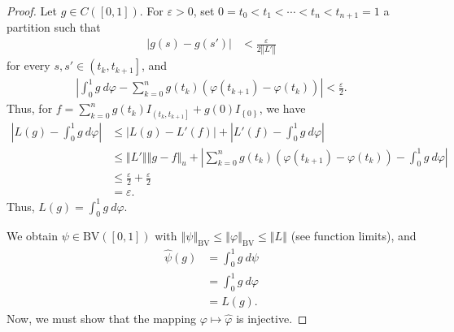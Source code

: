 \documentclass[12pt]{extarticle}
\newcommand{\norm}[1]{\left\Vert #1\right\Vert}
\newcommand{\set}[1]{\left\{#1\right\}}
\newcommand{\ve}{\varepsilon}
\theoremstyle{plain}
\theoremstyle{definition}
\theoremstyle{note}
\renewcommand{\newline}{\hfill\break}
\begin{document}
\begin{proof}
  Let $g \in C\left([0,1]\right)$. For $\ve > 0$, set $0 = t_0 < t_1 < \cdots < t_{n} < t_{n+1} = 1$ a partition such that
  \begin{align*}
    \left\vert g(s) - g(s') \right\vert &< \frac{\ve}{2\norm{L'}}
  \end{align*}
  for every $s,s'\in \left(t_{k},t_{k+1}\right]$, and
  \begin{align*}
    \left\vert \int_{0}^{1} g\:d\varphi - \sum_{k=0}^{n}g(t_k)\left(\varphi\left(t_{k+1}\right)-\varphi\left(t_{k}\right)\right) \right\vert < \frac{\ve}{2}.
  \end{align*}
  Thus, for $f = \sum_{k=0}^{n}g(t_k)I_{\left(t_{k},t_{k+1}\right]} + g(0)I_{\set{0}}$, we have
  \begin{align*}
    \left\vert L(g) - \int_{0}^{1} g\:d\varphi \right\vert &\leq \left\vert L(g) - L'(f) \right\vert + \left\vert L'(f) - \int_{0}^{1} g\:d\varphi \right\vert\\
                                                           &\leq \norm{L'}\norm{g - f}_{u} + \left\vert \sum_{k=0}^{n}g(t_k)\left(\varphi\left(t_{k+1}\right)- \varphi\left(t_k\right)\right) - \int_{0}^{1} g\:d\varphi \right\vert\\
                                                           &\leq \frac{\ve}{2} + \frac{\ve}{2}\\
                                                           &= \ve.
  \end{align*}
  Thus, $L(g) = \int_{0}^{1} g\:d\varphi$.\newline

  We obtain $\psi \in \text{BV}\left([0,1]\right)$ with $\norm{\psi}_{\text{BV}} \leq \norm{\varphi}_{\text{BV}}\leq \norm{L}$ (see function limits), and
  \begin{align*}
    \hat{\psi}(g) &= \int_{0}^{1} g\:d\psi\\
                  &= \int_{0}^{1} g\:d\varphi\\
                  &= L(g).
  \end{align*}
  Now, we must show that the mapping $\varphi \mapsto \hat\varphi$ is injective.\newline


\end{proof}
\end{document}

